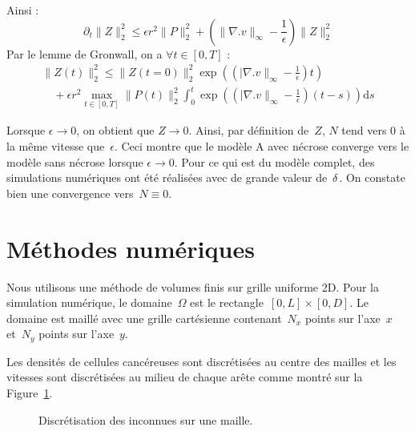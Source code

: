 \documentclass[main.tex]{subfiles}
\begin{document}
Ainsi :
\begin{equation}
\partial_t \|Z\|_2^2 \leq \epsilon r^2 \|P\|_2^2 + \left( \|\nabla.v\|_\infty - \frac{1}{\epsilon} \right) \| Z \|^2_2
\end{equation}
Par le lemme de Gronwall, on a $\forall t\in [0,T]$ :
\begin{equation}
\begin{array}{l}
\displaystyle \|Z(t)\|^2_2 \leq \|Z(t=0)\|_2^2 \exp \left(  \left(  |\nabla.v\|_\infty - \frac{1}{\epsilon} \right) t\right) \\
\displaystyle \quad + \epsilon r^2 \max_{t\in[0,T]} \| P(t) \|^2_2 \int_0^t \exp \left(  \left(  |\nabla.v\|_\infty - \frac{1}{\epsilon} \right) (t-s) \right) \textrm{d}s
\end{array}
\end{equation}

Lorsque $\epsilon \to 0$, on obtient que $Z \to 0$. Ainsi, par définition de~$Z$, $N$ tend vers 0 à la même vitesse que~$\epsilon$. Ceci montre que le modèle A avec nécrose converge vers le modèle sans nécrose lorsque $\epsilon \to 0$. 
Pour ce qui est du modèle complet, des simulations numériques ont été réalisées avec de grande valeur de~$\delta$. On constate bien une convergence vers~$N\equiv0$.


\section{Méthodes numériques}\label{sec:NumMet}

Nous utilisons une méthode de volumes finis sur grille uniforme 2D. Pour la simulation numérique, le domaine~$\Omega$ est le 
rectangle~$[0,L]\times[0,D]$. Le domaine est maillé avec une grille cartésienne contenant~$N_x$ points sur l'axe~$x$ et~$N_y$ points sur l'axe~$y$.

Les densités de cellules cancéreuses sont discrétisées au centre des mailles et les vitesses sont discrétisées au milieu de chaque arête comme montré sur la Figure~\ref{fig:place_inconnues}.

\begin{figure}[h]
\centering

\caption{Discrétisation des inconnues sur une maille.\label{fig:place_inconnues}}
\end{figure}
\end{document}
